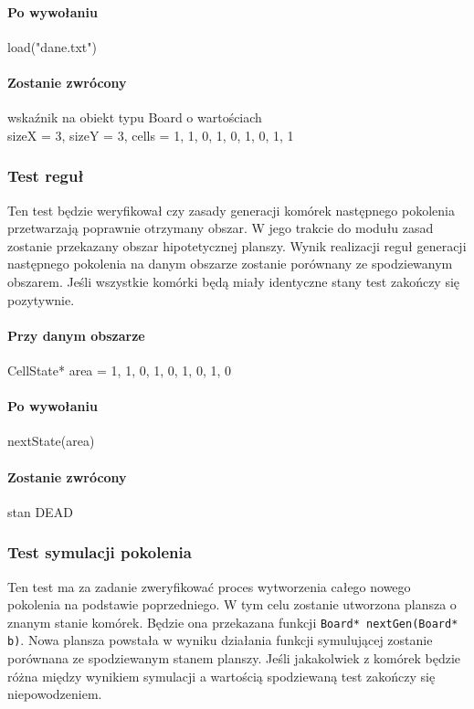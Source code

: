 \documentclass{article}
\begin{document}
\paragraph{Po wywołaniu} load("dane.txt")
\paragraph{Zostanie zwrócony} wskaźnik na obiekt typu Board o wartościach \\ sizeX = 3, sizeY = 3, cells = {1, 1, 0, 1, 0, 1, 0, 1, 1 }

\subsubsection{Test reguł} 
Ten test będzie weryfikował czy zasady generacji komórek następnego pokolenia przetwarzają poprawnie otrzymany obszar. W jego trakcie do modułu zasad zostanie przekazany obszar hipotetycznej planszy. Wynik realizacji reguł generacji następnego pokolenia na danym obszarze zostanie porównany ze spodziewanym obszarem. Jeśli wszystkie komórki będą miały identyczne stany test zakończy się pozytywnie.

\paragraph{Przy danym obszarze} CellState* area = {1, 1, 0, 1, 0, 1, 0, 1, 0}
\paragraph{Po wywołaniu} nextState(area)
\paragraph{Zostanie zwrócony} stan DEAD

\subsubsection{Test symulacji pokolenia} 
Ten test ma za zadanie zweryfikować proces wytworzenia całego nowego pokolenia na podstawie poprzedniego. W tym celu zostanie utworzona plansza o znanym stanie komórek. Będzie ona przekazana funkcji \texttt{Board* nextGen(Board* b)}. Nowa plansza powstała w wyniku działania funkcji symulującej zostanie porównana ze spodziewanym stanem planszy. Jeśli jakakolwiek z komórek będzie różna między wynikiem symulacji a wartością spodziewaną test zakończy się niepowodzeniem.
\end{document}
